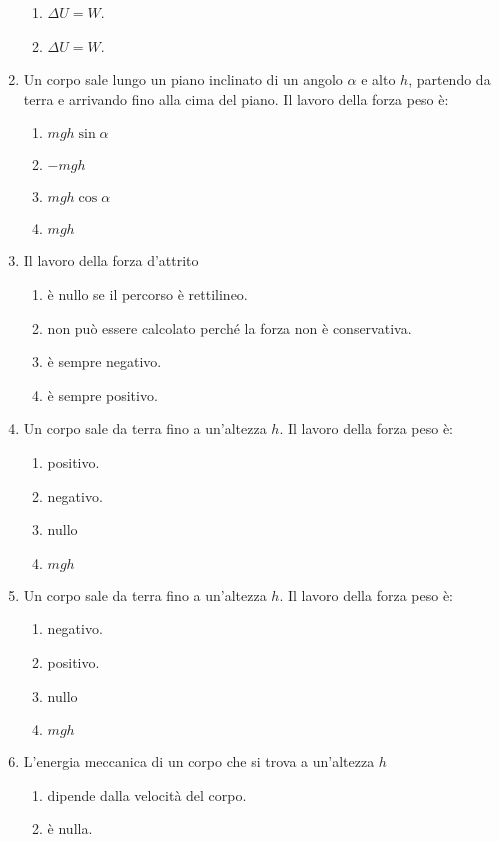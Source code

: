 \documentclass{article}
\begin{document}
\begin{enumerate}
\begin{enumerate}[label=\Alph*.]
    \item $\Delta U=W$.
    \item $\Delta U=W$.
  \end{enumerate}
  \item Un corpo sale lungo un piano inclinato di un angolo $\alpha$ e alto $h$, partendo da terra e arrivando fino alla cima del piano. Il lavoro della forza peso è:
  \begin{enumerate}[label=\Alph*.]
    \item $mgh\sin\alpha$
    \item $-mgh$
    \item $mgh\cos\alpha$
    \item $mgh$
  \end{enumerate}
  \item Il lavoro della forza d'attrito
  \begin{enumerate}[label=\Alph*.]
    \item è nullo se il percorso è rettilineo.
    \item non può essere calcolato perché la forza non è conservativa.
    \item è sempre negativo.
    \item è sempre positivo.
  \end{enumerate}
  \item Un corpo sale da terra fino a un'altezza $h$. Il lavoro della forza peso è:
  \begin{enumerate}[label=\Alph*.]
    \item positivo.
    \item negativo.
    \item nullo
    \item $mgh$
  \end{enumerate}
  \item Un corpo sale da terra fino a un'altezza $h$. Il lavoro della forza peso è:
  \begin{enumerate}[label=\Alph*.]
    \item negativo.
    \item positivo.
    \item nullo
    \item $mgh$
  \end{enumerate}
  \item L'energia meccanica di un corpo che si trova a un'altezza $h$
  \begin{enumerate}[label=\Alph*.]
    \item dipende dalla velocità del corpo.
    \item è nulla.

\end{enumerate}
\end{enumerate}
\end{document}
